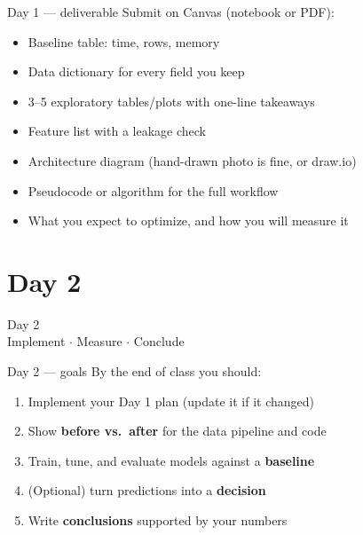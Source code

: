 \documentclass[aspectratio=43,11pt]{beamer}
\begin{document}
\begin{frame}{Day 1 --- deliverable}
  Submit on Canvas (notebook or PDF):
  \vspace{0.5em}
  \begin{itemize}
    \item[$\square$] Baseline table: time, rows, memory
    \item[$\square$] Data dictionary for every field you keep
    \item[$\square$] 3--5 exploratory tables/plots with one-line takeaways
    \item[$\square$] Feature list with a leakage check
    \item[$\square$] Architecture diagram (hand-drawn photo is fine, or draw.io)
    \item[$\square$] Pseudocode or algorithm for the full workflow
    \item[$\square$] What you expect to optimize, and how you will measure it
  \end{itemize}
\end{frame}

\section{Day 2}

\begin{frame}
  \centering
  \Huge Day 2 \\[0.5em]
  \large Implement $\cdot$ Measure $\cdot$ Conclude
\end{frame}

\begin{frame}{Day 2 --- goals}
  By the end of class you should:
  \vspace{0.5em}
  \begin{enumerate}
    \item Implement your Day 1 plan (update it if it changed)
    \item Show \textbf{before vs.\ after} for the data pipeline and code
    \item Train, tune, and evaluate models against a \textbf{baseline}
    \item (Optional) turn predictions into a \textbf{decision}
    \item Write \textbf{conclusions} supported by your numbers
  \end{enumerate}
\end{frame}
\end{document}
